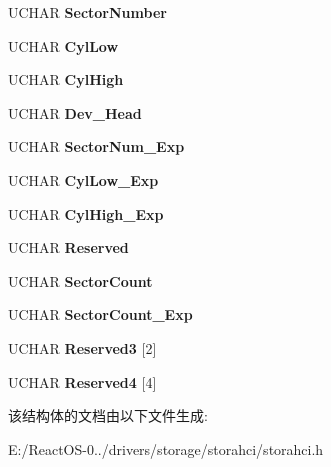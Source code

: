 \begin{DoxyCompactItemize}
U\+C\+H\+AR {\bfseries Sector\+Number}
\item 
\mbox{\label{struct___a_h_c_i___d2_h___r_e_g_i_s_t_e_r___f_i_s_aef42fbc982b6b20ff7276e9caa48f940}} 
U\+C\+H\+AR {\bfseries Cyl\+Low}
\item 
\mbox{\label{struct___a_h_c_i___d2_h___r_e_g_i_s_t_e_r___f_i_s_af46c57c2c7b49df78d2eca01b9495eee}} 
U\+C\+H\+AR {\bfseries Cyl\+High}
\item 
\mbox{\label{struct___a_h_c_i___d2_h___r_e_g_i_s_t_e_r___f_i_s_ad6fd86cfced6ce9f8a6448b7f7381389}} 
U\+C\+H\+AR {\bfseries Dev\+\_\+\+Head}
\item 
\mbox{\label{struct___a_h_c_i___d2_h___r_e_g_i_s_t_e_r___f_i_s_a7cc916f7f1cd80692c232cae073b7aae}} 
U\+C\+H\+AR {\bfseries Sector\+Num\+\_\+\+Exp}
\item 
\mbox{\label{struct___a_h_c_i___d2_h___r_e_g_i_s_t_e_r___f_i_s_ad6b1089c7966b490e1a2a24b4f02e31a}} 
U\+C\+H\+AR {\bfseries Cyl\+Low\+\_\+\+Exp}
\item 
\mbox{\label{struct___a_h_c_i___d2_h___r_e_g_i_s_t_e_r___f_i_s_af31a685b67be66fddabb34a71dfbb149}} 
U\+C\+H\+AR {\bfseries Cyl\+High\+\_\+\+Exp}
\item 
\mbox{\label{struct___a_h_c_i___d2_h___r_e_g_i_s_t_e_r___f_i_s_aa9aa2bcd2ed01df84628d712d5033555}} 
U\+C\+H\+AR {\bfseries Reserved}
\item 
\mbox{\label{struct___a_h_c_i___d2_h___r_e_g_i_s_t_e_r___f_i_s_ab455609427ee21aee6073b159bccae9d}} 
U\+C\+H\+AR {\bfseries Sector\+Count}
\item 
\mbox{\label{struct___a_h_c_i___d2_h___r_e_g_i_s_t_e_r___f_i_s_a25c40888fd7637840428efcd587bc69a}} 
U\+C\+H\+AR {\bfseries Sector\+Count\+\_\+\+Exp}
\item 
\mbox{\label{struct___a_h_c_i___d2_h___r_e_g_i_s_t_e_r___f_i_s_aa325db9fda2a0e9e72d21029e36a7f93}} 
U\+C\+H\+AR {\bfseries Reserved3} \mbox{[}2\mbox{]}
\item 
\mbox{\label{struct___a_h_c_i___d2_h___r_e_g_i_s_t_e_r___f_i_s_a15d8e6678ed8c3a9f6fc379df20441a4}} 
U\+C\+H\+AR {\bfseries Reserved4} \mbox{[}4\mbox{]}
\end{DoxyCompactItemize}


该结构体的文档由以下文件生成\+:\begin{DoxyCompactItemize}
\item 
E\+:/\+React\+O\+S-\/0../drivers/storage/storahci/storahci.\+h\end{DoxyCompactItemize}
